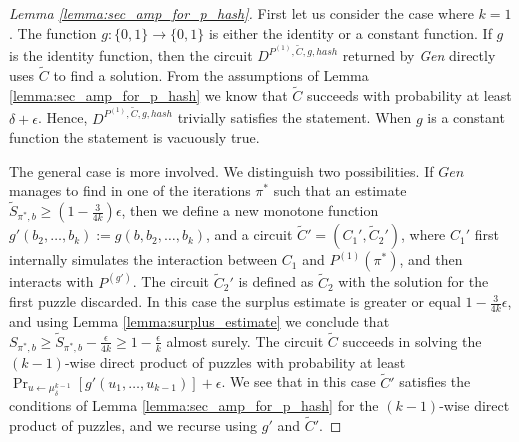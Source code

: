 \begin{proof}[Lemma \ref{lemma:sec_amp_for_p_hash}]
First let us consider the case where $k=1$. The function $g: \{0,1\} \rightarrow \{0,1\}$ is either the identity or a constant function.
If $g$ is the identity function, then the circuit $D^{P^{(1)}, \widetilde{C}, g, hash}$ returned by \textit{Gen} directly uses $\widetilde{C}$ to find a solution.
From the assumptions of Lemma \ref{lemma:sec_amp_for_p_hash} we know that $\widetilde{C}$ succeeds with probability at least
$\delta + \epsilon$. Hence, $D^{P^{(1)},\widetilde{C}, g, hash}$ trivially satisfies the statement.
When $g$ is a constant function the statement is vacuously true.

The general case is more involved. We distinguish two possibilities.
If $Gen$ manages to find in one of the iterations $\pi^*$ such that an estimate
$\widetilde{S}_{\pi^*,b} \geq (1-\frac{3}{4k})\epsilon$, then we define a new monotone function
$g'(b_2, \dots, b_k) := g(b, b_2, \dots, b_k)$, and a circuit $\widetilde{C}' = (C_1', \widetilde{C}_2')$, where
$C_1'$ first internally simulates the interaction between $C_1$ and $P^{(1)}(\pi^*)$, and then interacts with $P^{(g')}$.
The circuit $\widetilde{C}_2'$ is defined as $\widetilde{C}_2$ with the solution for the first puzzle discarded.
In this case the surplus estimate is greater or equal $1 - \frac{3}{4k}\epsilon$, and using Lemma \ref{lemma:surplus_estimate}
we conclude that $S_{\pi^*,b} \geq \widetilde{S}_{\pi^*, b} - \frac{\epsilon}{4k} \geq 1 - \frac{\epsilon}{k}$ almost surely.
The circuit $\widetilde{C}$ succeeds in solving the $(k-1)$-wise direct product of puzzles with probability
at least $\Pr_{u \leftarrow \mu^{k-1}_{\delta}}[g'(u_1,\dots, u_{k-1} )] + \epsilon$.
We see that in this case $\widetilde{C}'$ satisfies the conditions of Lemma \ref{lemma:sec_amp_for_p_hash}
for the $(k-1)$-wise direct product of puzzles, and we recurse using $g'$ and $\widetilde{C}'$.


\end{proof}
